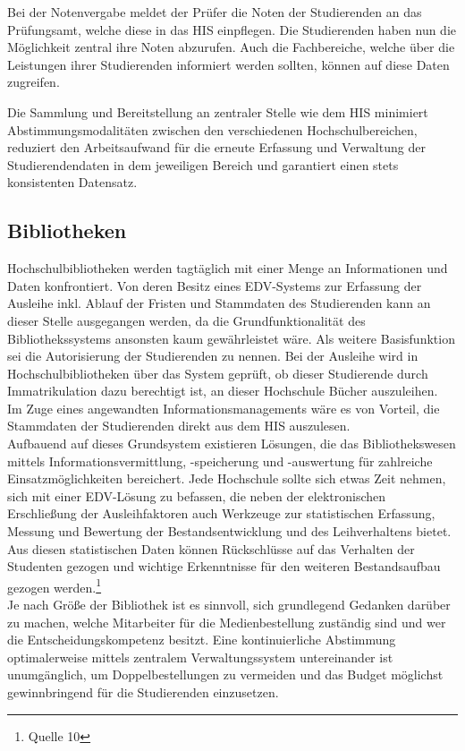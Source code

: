 Bei der Notenvergabe meldet der Prüfer die Noten der Studierenden an das Prüfungsamt, welche diese in das HIS einpflegen. Die Studierenden haben nun die Möglichkeit zentral ihre Noten abzurufen. Auch die Fachbereiche, welche über die Leistungen ihrer Studierenden informiert werden sollten, können auf diese Daten zugreifen.

Die Sammlung und Bereitstellung an zentraler Stelle wie dem HIS minimiert Abstimmungsmodalitäten zwischen den verschiedenen Hochschulbereichen, reduziert den Arbeitsaufwand für die erneute Erfassung und Verwaltung der Studierendendaten in dem jeweiligen Bereich und garantiert einen stets konsistenten Datensatz.

\subsection{Bibliotheken}
Hochschulbibliotheken werden tagtäglich mit einer Menge an Informationen und Daten konfrontiert. Von deren Besitz eines EDV-Systems zur Erfassung der Ausleihe inkl. Ablauf der Fristen und Stammdaten des Studierenden kann an dieser Stelle ausgegangen werden, da die Grundfunktionalität des Bibliothekssystems ansonsten kaum gewährleistet wäre. Als weitere Basisfunktion sei die Autorisierung der Studierenden zu nennen. Bei der Ausleihe wird in Hochschulbibliotheken über das System geprüft, ob dieser Studierende durch Immatrikulation dazu berechtigt ist, an dieser Hochschule Bücher auszuleihen.\\

Im Zuge eines angewandten Informationsmanagements wäre es von Vorteil, die Stammdaten der Studierenden direkt aus dem HIS auszulesen.\\

Aufbauend auf dieses Grundsystem existieren Lösungen, die das Bibliothekswesen mittels Informationsvermittlung, -speicherung und -auswertung für zahlreiche Einsatzmöglichkeiten bereichert. Jede Hochschule sollte sich etwas Zeit nehmen, sich mit einer EDV-Lösung zu befassen, die neben der elektronischen Erschließung der Ausleihfaktoren auch Werkzeuge zur statistischen Erfassung, Messung und Bewertung der Bestandsentwicklung und des Leihverhaltens bietet. Aus diesen statistischen Daten können Rückschlüsse auf das Verhalten der Studenten gezogen und wichtige Erkenntnisse für den weiteren Bestandsaufbau gezogen werden.\footnote{Quelle 10}\\

Je nach Größe der Bibliothek ist es sinnvoll, sich grundlegend Gedanken darüber zu machen, welche Mitarbeiter für die Medienbestellung zuständig sind und wer die Entscheidungskompetenz besitzt. Eine kontinuierliche Abstimmung optimalerweise mittels zentralem Verwaltungssystem untereinander ist unumgänglich, um Doppelbestellungen zu vermeiden und das Budget möglichst gewinnbringend für die Studierenden einzusetzen.\\

